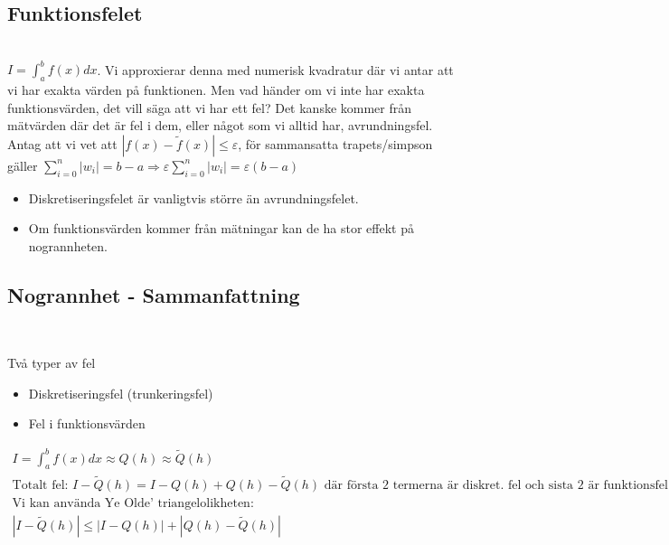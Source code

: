 
\subsection{Funktionsfelet}\hfill\\

\noindent $I = \int_{a}^{b}f(x)dx$. Vi approxierar denna med numerisk kvadratur där vi antar att vi har exakta värden på funktionen. Men vad händer om vi inte har exakta funktionsvärden, det vill säga att vi har ett fel? Det kanske kommer från mätvärden där det är fel i dem, eller något som vi alltid har, avrundningsfel. Antag att vi vet att $|f(x)-\tilde{f}(x)|\leq\varepsilon$, för sammansatta trapets/simpson gäller $\sum_{i=0}^{n}|w_i|=b-a \Rightarrow\varepsilon\sum_{i=0}^{n}|w_i|=\varepsilon(b-a)$
\par\bigskip
\begin{itemize}
  \item Diskretiseringsfelet är vanligtvis större än avrundningsfelet.
  \item Om funktionsvärden kommer från mätningar kan de ha stor effekt på nogrannheten.
\end{itemize}
\par\bigskip

\subsection{Nogrannhet - Sammanfattning}\hfill\\
\par\bigskip

\noindent Två typer av fel
\begin{itemize}
  \item Diskretiseringsfel (trunkeringsfel)
  \item Fel i funktionsvärden 
\end{itemize}


\begin{equation*}
  \begin{gathered}
    I = \int_{a}^{b}f(x)dx \approx Q(h)\approx\tilde{Q}(h)\\
    \text{Totalt fel: } I-\tilde{Q}(h)=I-Q(h)+Q(h)-\tilde{Q}(h) \text{ där första 2 termerna är diskret. fel och sista 2 är funktionsfel}\\
    \text{Vi kan använda Ye Olde' triangelolikheten: }\\
    |I-\tilde{Q}(h)|\leq |I-Q(h)|+|Q(h)-\tilde{Q}(h)|
  \end{gathered}
\end{equation*}
\par\bigskip

